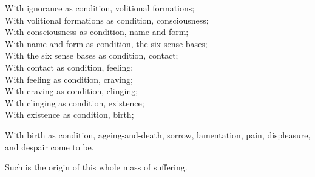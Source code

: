 \begin{english-verses}
  With ignorance as condition, volitional formations;\\
  With volitional formations as condition, consciousness;\\
  With consciousness as condition, name-and-form;\\
  With name-and-form as condition, the six sense bases;\\
  With the six sense bases as condition, contact;\\
  With contact as condition, feeling;\\
  With feeling as condition, craving;\\
  With craving as condition, clinging;\\
  With clinging as condition, existence;\\
  With existence as condition, birth;
\end{english-verses}
\begin{english-hangtogether-verses}
  With birth as condition, ageing-and-death, sorrow, lamentation, pain, displeasure, and despair come to be.
\end{english-hangtogether-verses}
\begin{english-hangtogether-verses}
  Such is the origin of this whole mass of suffering.
\end{english-hangtogether-verses}

